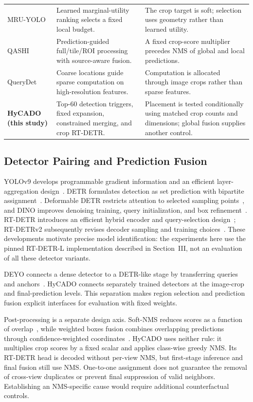 \documentclass[journal]{IEEEtran}
\begin{document}
\begin{table}[t]
\begin{tabular}{@{}>{\raggedright\arraybackslash}p{}>{\raggedright\arraybackslash}p{}>{\raggedright\arraybackslash}p{}@{}}
MRU-YOLO~\cite{chen2026mru} & Learned marginal-utility ranking selects a fixed local budget. & The crop target is soft; selection uses geometry rather than learned utility.\\
QASHI~\cite{tang2026qashi} & Prediction-guided full/tile/ROI processing with source-aware fusion. & A fixed crop-score multiplier precedes NMS of global and local predictions.\\
QueryDet~\cite{yang2022querydet} & Coarse locations guide sparse computation on high-resolution features. & Computation is allocated through image crops rather than sparse features.\\
\textbf{HyCADO (this study)} & Top-60 detection triggers, fixed expansion, constrained merging, and crop RT-DETR. & Placement is tested conditionally using matched crop counts and dimensions; global fusion supplies another control.\\
\bottomrule
\end{tabular}
\end{table}

\subsection{Detector Pairing and Prediction Fusion}
YOLOv9 develops programmable gradient information and an efficient layer-aggregation design~\cite{wang2024yolov9}. DETR formulates detection as set prediction with bipartite assignment~\cite{carion2020detr}. Deformable DETR restricts attention to selected sampling points~\cite{zhu2021deformable}, and DINO improves denoising training, query initialization, and box refinement~\cite{zhang2023dino}. RT-DETR introduces an efficient hybrid encoder and query-selection design~\cite{zhao2024rtdetr}; RT-DETRv2 subsequently revises decoder sampling and training choices~\cite{lv2024rtdetrv2}. These developments motivate precise model identification: the experiments here use the pinned RT-DETR-L implementation described in Section~III, not an evaluation of all these detector variants.

DEYO connects a dense detector to a DETR-like stage by transferring queries and anchors~\cite{ouyang2022deyo}. HyCADO connects separately trained detectors at the image-crop and final-prediction levels. This separation makes region selection and prediction fusion explicit interfaces for evaluation with fixed weights.

Post-processing is a separate design axis. Soft-NMS reduces scores as a function of overlap~\cite{bodla2017softnms}, while weighted boxes fusion combines overlapping predictions through confidence-weighted coordinates~\cite{solovyev2021wbf}. HyCADO uses neither rule: it multiplies crop scores by a fixed scalar and applies class-wise greedy NMS. Its RT-DETR head is decoded without per-view NMS, but first-stage inference and final fusion still use NMS. One-to-one assignment does not guarantee the removal of cross-view duplicates or prevent final suppression of valid neighbors. Establishing an NMS-specific cause would require additional counterfactual controls.
\end{document}
